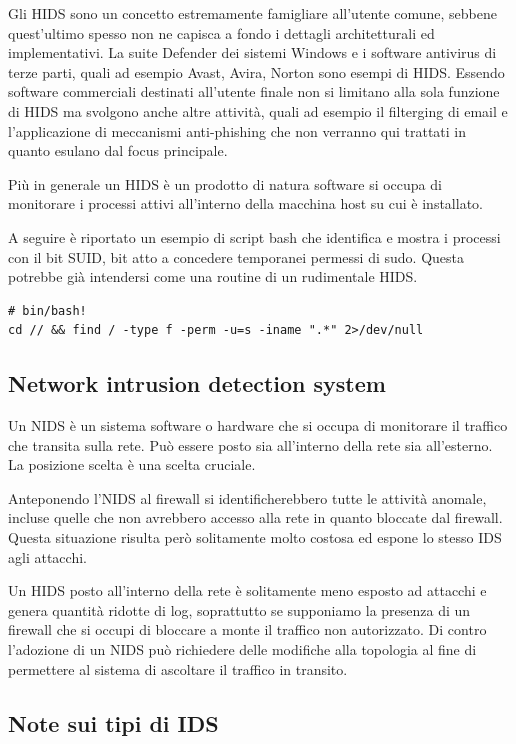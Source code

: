 \documentclass{ldr-article}
\begin{document}
Gli HIDS sono un concetto estremamente famigliare all'utente comune, sebbene quest'ultimo spesso non ne capisca a fondo i dettagli architetturali ed implementativi. La suite Defender dei sistemi Windows e i software antivirus di terze parti, quali ad esempio Avast, Avira, Norton sono esempi di HIDS. Essendo software commerciali destinati all'utente finale non si limitano alla sola funzione di HIDS ma svolgono anche altre attività, quali ad esempio il filterging di email e l'applicazione di meccanismi anti-phishing che non verranno qui trattati in quanto esulano dal focus principale.

Più in generale un HIDS è un prodotto di natura software si occupa di monitorare i processi attivi all'interno della macchina host su cui è installato.

A seguire è riportato un esempio di script bash che identifica e mostra i processi con il bit SUID, bit atto a concedere temporanei permessi di sudo. Questa potrebbe già intendersi come una routine di un rudimentale HIDS.

\begin{lstlisting}
# bin/bash!
cd // && find / -type f -perm -u=s -iname ".*" 2>/dev/null
\end{lstlisting}


\subsection{Network intrusion detection system}
Un NIDS è un sistema software o hardware che si occupa di monitorare il traffico che transita sulla rete. Può essere posto sia all'interno della rete sia all'esterno. La posizione scelta è una scelta cruciale.

Anteponendo l'NIDS al firewall si identificherebbero tutte le attività anomale, incluse quelle che non avrebbero accesso alla rete in quanto bloccate dal firewall. Questa situazione risulta però solitamente molto costosa ed espone lo stesso IDS agli attacchi.

Un HIDS posto all'interno della rete è solitamente meno esposto ad attacchi e genera quantità ridotte di log, soprattutto se supponiamo la presenza di un firewall che si occupi di bloccare a monte il traffico non autorizzato. Di contro l'adozione di un NIDS può richiedere delle modifiche alla topologia al fine di permettere al sistema di ascoltare il traffico in transito.

\subsection{Note sui tipi di IDS}
\end{document}
